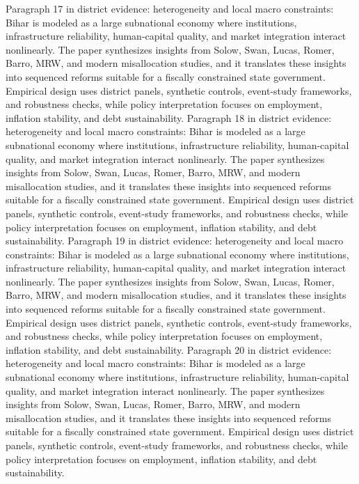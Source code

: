 \documentclass[preprint,12pt]{elsarticle}
\begin{document}
Paragraph 17 in district evidence: heterogeneity and local macro constraints: Bihar is modeled as a large subnational economy where institutions, infrastructure reliability, human-capital quality, and market integration interact nonlinearly. The paper synthesizes insights from Solow, Swan, Lucas, Romer, Barro, MRW, and modern misallocation studies, and it translates these insights into sequenced reforms suitable for a fiscally constrained state government. Empirical design uses district panels, synthetic controls, event-study frameworks, and robustness checks, while policy interpretation focuses on employment, inflation stability, and debt sustainability.
Paragraph 18 in district evidence: heterogeneity and local macro constraints: Bihar is modeled as a large subnational economy where institutions, infrastructure reliability, human-capital quality, and market integration interact nonlinearly. The paper synthesizes insights from Solow, Swan, Lucas, Romer, Barro, MRW, and modern misallocation studies, and it translates these insights into sequenced reforms suitable for a fiscally constrained state government. Empirical design uses district panels, synthetic controls, event-study frameworks, and robustness checks, while policy interpretation focuses on employment, inflation stability, and debt sustainability.
Paragraph 19 in district evidence: heterogeneity and local macro constraints: Bihar is modeled as a large subnational economy where institutions, infrastructure reliability, human-capital quality, and market integration interact nonlinearly. The paper synthesizes insights from Solow, Swan, Lucas, Romer, Barro, MRW, and modern misallocation studies, and it translates these insights into sequenced reforms suitable for a fiscally constrained state government. Empirical design uses district panels, synthetic controls, event-study frameworks, and robustness checks, while policy interpretation focuses on employment, inflation stability, and debt sustainability.
Paragraph 20 in district evidence: heterogeneity and local macro constraints: Bihar is modeled as a large subnational economy where institutions, infrastructure reliability, human-capital quality, and market integration interact nonlinearly. The paper synthesizes insights from Solow, Swan, Lucas, Romer, Barro, MRW, and modern misallocation studies, and it translates these insights into sequenced reforms suitable for a fiscally constrained state government. Empirical design uses district panels, synthetic controls, event-study frameworks, and robustness checks, while policy interpretation focuses on employment, inflation stability, and debt sustainability.
\end{document}
